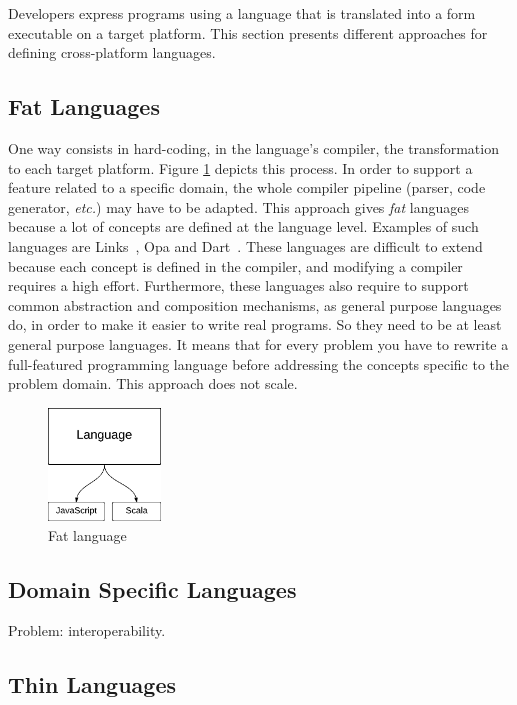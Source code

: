 \documentclass[preprint]{sigplanconf}
\newcommand{\etc}{\emph{etc.}}
\begin{document}
Developers express programs using a language that is translated into a form executable on a target platform. This
section presents different approaches for defining cross-platform languages.

\subsection{Fat Languages}

One way consists in hard-coding, in the language's compiler, the transformation to each target platform. Figure
\ref{fat-lang} depicts this process. In order to support a feature related to a specific domain, the whole compiler
pipeline (parser, code generator, \etc) may have to be adapted. This approach gives \emph{fat} languages because
a lot of concepts are defined at the language level. Examples of such languages are Links~\cite{Cooper07_Links},
Opa and Dart~\cite{Griffith11_Dart}. These languages are difficult to extend because each concept is defined in the
compiler, and modifying a compiler requires a high effort. Furthermore, these languages also require to support
common abstraction and composition mechanisms, as general purpose languages do, in order to make it easier to write
real programs. So they need to be at least general purpose languages. It means that for every problem you have to
rewrite a full-featured programming language before addressing the concepts specific to the problem domain. This
approach does not scale.

\begin{figure}
  \centering
  \includegraphics[width=3cm]{fat.pdf}
  \caption{Fat language}
  \label{fat-lang}
\end{figure}

\subsection{Domain Specific Languages}

Problem: interoperability.

\subsection{Thin Languages}
\end{document}
